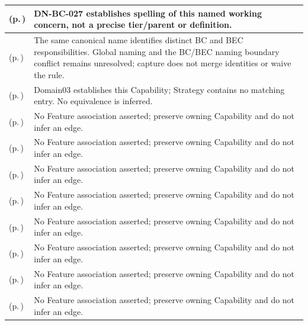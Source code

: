 \begin{longtable}{|>{\raggedright\arraybackslash}p{0.38\TableWidth}|>{\raggedright\arraybackslash}p{0.62\TableWidth}|}
\nameref{cap:bc-health-information-sharing-programme-management} (p.\,\pageref{cap:bc-health-information-sharing-programme-management}) & DN-BC-027 establishes spelling of this named working concern, not a precise tier/parent or definition.\\\hline
\nameref{cap:bec-health-information-exchange} (p.\,\pageref{cap:bec-health-information-exchange}) & The same canonical name identifies distinct BC and BEC responsibilities. Global naming and the BC/BEC naming boundary conflict remains unresolved; capture does not merge identities or waive the rule.\\\hline
\nameref{cap:bec-credential-management} (p.\,\pageref{cap:bec-credential-management}) & Domain03 establishes this Capability; Strategy contains no matching entry. No equivalence is inferred.\\\hline
\nameref{function:associate-order-outcome} (p.\,\pageref{function:associate-order-outcome}) & No Feature association asserted; preserve owning Capability and do not infer an edge.\\\hline
\nameref{service:order-outcome-notification} (p.\,\pageref{service:order-outcome-notification}) & No Feature association asserted; preserve owning Capability and do not infer an edge.\\\hline
\nameref{function:associate-care-plan-context} (p.\,\pageref{function:associate-care-plan-context}) & No Feature association asserted; preserve owning Capability and do not infer an edge.\\\hline
\nameref{service:care-plan-context-query} (p.\,\pageref{service:care-plan-context-query}) & No Feature association asserted; preserve owning Capability and do not infer an edge.\\\hline
\nameref{function:distribute-care-plan-change} (p.\,\pageref{function:distribute-care-plan-change}) & No Feature association asserted; preserve owning Capability and do not infer an edge.\\\hline
\nameref{service:care-plan-change-notification} (p.\,\pageref{service:care-plan-change-notification}) & No Feature association asserted; preserve owning Capability and do not infer an edge.\\\hline
\nameref{function:coordinate-multi-agency-chronic-care-plan} (p.\,\pageref{function:coordinate-multi-agency-chronic-care-plan}) & No Feature association asserted; preserve owning Capability and do not infer an edge.\\\hline
\nameref{service:chronic-care-timeline-query} (p.\,\pageref{service:chronic-care-timeline-query}) & No Feature association asserted; preserve owning Capability and do not infer an edge.\\\hline

\end{longtable}
